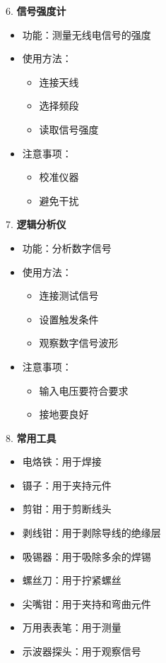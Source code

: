 \documentclass[12pt,UTF8]{ctexbook}
\begin{document}
6. \textbf{信号强度计}
   \begin{itemize}[leftmargin=3.5em]
   \item 功能：测量无线电信号的强度
   \item 使用方法：
     \begin{itemize}
       \item 连接天线
       \item 选择频段
       \item 读取信号强度
     \end{itemize}
   \item 注意事项：
     \begin{itemize}
       \item 校准仪器
       \item 避免干扰
     \end{itemize}
   \end{itemize}

7. \textbf{逻辑分析仪}
   \begin{itemize}[leftmargin=3.5em]
   \item 功能：分析数字信号
   \item 使用方法：
     \begin{itemize}
       \item 连接测试信号
       \item 设置触发条件
       \item 观察数字信号波形
     \end{itemize}
   \item 注意事项：
     \begin{itemize}
       \item 输入电压要符合要求
       \item 接地要良好
     \end{itemize}
   \end{itemize}

8. \textbf{常用工具}
   \begin{itemize}[leftmargin=3.5em]
   \item 电烙铁：用于焊接
   \item 镊子：用于夹持元件
   \item 剪钳：用于剪断线头
   \item 剥线钳：用于剥除导线的绝缘层
   \item 吸锡器：用于吸除多余的焊锡
   \item 螺丝刀：用于拧紧螺丝
   \item 尖嘴钳：用于夹持和弯曲元件
   \item 万用表表笔：用于测量
   \item 示波器探头：用于观察信号
   \end{itemize}
\end{document}
